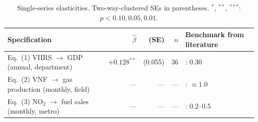 \begin{table}[H]
\centering
\caption{Single-series elasticities. Two-way-clustered SEs in parentheses.
$^{*}$, $^{**}$, $^{***}$: $p<0.10,0.05,0.01$.}
\label{tab:elasticities}
\small
\begin{tabular}{lrrrl}
\toprule
Specification & $\hat\beta$ & (SE) & $n$ & Benchmark from literature \\
\midrule
Eq.~(1) VIIRS $\to$ GDP (annual, department) & $+0.128^{**}$ & (0.055) & 36 & \citet{hsw2012}: 0.30 \\
Eq.~(2) VNF $\to$ gas production (monthly, field) & --- & --- & --- & \citet{do_etal2018}: $\approx 1.0$ \\
Eq.~(3) NO$_2$ $\to$ fuel sales (monthly, metro) & --- & --- & --- & \citet{bauwens2020}: 0.2--0.5 \\
\bottomrule
\end{tabular}
\end{table}
